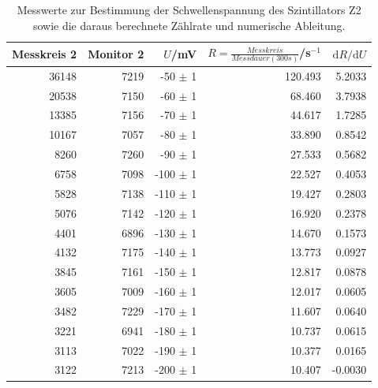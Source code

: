 \begin{table}[H]
    \centering
    \caption{Messwerte zur Bestimmung der Schwellenspannung des Szintillators Z2 sowie die daraus berechnete Zählrate und numerische Ableitung.}
    \label{tab:schwellspannung_z2}
    \begin{tabular}{rrrrr}
        \toprule
        Messkreis 2 & Monitor 2 & $U$/mV & $R=\frac{Messkreis}{Messdauer(300s)}$/s$^{-1}$ & $\mathrm{d}R/\mathrm{d}U$ \\
        \midrule
        36148 & 7219 & -50 \(\pm\) 1 & 120.493 &  5.2033 \\
        20538 & 7150 & -60  \(\pm\) 1 &  68.460 &  3.7938 \\
        13385 & 7156 & -70  \(\pm\) 1 &  44.617 &  1.7285 \\
        10167 & 7057 & -80  \(\pm\) 1 &  33.890 &  0.8542 \\
         8260 & 7260 & -90  \(\pm\) 1 &  27.533 &  0.5682 \\
         6758 & 7098 & -100 \(\pm\) 1 &  22.527 &  0.4053 \\
         5828 & 7138 & -110 \(\pm\) 1 &  19.427 &  0.2803 \\
         5076 & 7142 & -120 \(\pm\) 1 &  16.920 &  0.2378 \\
         4401 & 6896 & -130 \(\pm\) 1 &  14.670 &  0.1573 \\
         4132 & 7175 & -140 \(\pm\) 1 &  13.773 &  0.0927 \\
         3845 & 7161 & -150 \(\pm\) 1 &  12.817 &  0.0878 \\
         3605 & 7009 & -160 \(\pm\) 1 &  12.017 &  0.0605 \\
         3482 & 7229 & -170 \(\pm\) 1 &  11.607 &  0.0640 \\
         3221 & 6941 & -180 \(\pm\) 1 &  10.737 &  0.0615 \\
         3113 & 7022 & -190 \(\pm\) 1 &  10.377 &  0.0165 \\
         3122 & 7213 & -200 \(\pm\) 1 &  10.407 & -0.0030 \\
        \bottomrule
    \end{tabular}
\end{table}

